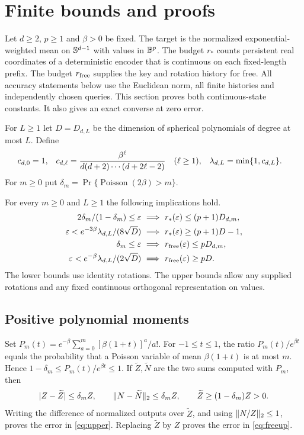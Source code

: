 \section{Finite bounds and proofs}\label{sec:finite}
Let $d\ge2$, $p\ge1$ and $\beta>0$ be fixed. The target is the normalized exponential-weighted mean on $\mathbb S^{d-1}$ with values in $\mathbb B^p$. The budget $r_*$ counts persistent real coordinates of a deterministic encoder that is continuous on each fixed-length prefix. The budget $r_{\mathrm{free}}$ supplies the key and rotation history for free. All accuracy statements below use the Euclidean norm, all finite histories and independently chosen queries. This section proves both continuous-state constants. It also gives an exact converse at zero error.

For $L\ge1$ let $D=D_{d,L}$ be the dimension of spherical polynomials of degree at most $L$. Define
\begin{align}
 c_{d,0}&=1, &
 c_{d,\ell}&=\frac{\beta^\ell}{d(d+2)\cdots(d+2\ell-2)}\quad(\ell\ge1),&
 \lambda_{d,L}&=\min\{1,c_{d,L}\}.\label{eq:spectralconst}
\end{align}
For $m\ge0$ put $\delta_m=\Pr\{\operatorname{Poisson}(2\beta)>m\}$.

\begin{theorem}\label{thm:finite}
For every $m\ge0$ and $L\ge1$ the following implications hold.
\begin{align}
 2\delta_m/(1-\delta_m)\le\varepsilon
 &\ \Longrightarrow\ r_*(\varepsilon)\le(p+1)D_{d,m},\label{eq:upper}\\
 \varepsilon<e^{-3\beta}\lambda_{d,L}/(8\sqrt D)
 &\ \Longrightarrow\ r_*(\varepsilon)\ge(p+1)D-1,\label{eq:lower}\\
 \delta_m\le\varepsilon
 &\ \Longrightarrow\ r_{\mathrm{free}}(\varepsilon)\le pD_{d,m},\label{eq:freeup}\\
 \varepsilon<e^{-\beta}\lambda_{d,L}/(2\sqrt D)
 &\ \Longrightarrow\ r_{\mathrm{free}}(\varepsilon)\ge pD.\label{eq:freelow}
\end{align}
The lower bounds use identity rotations. The upper bounds allow any supplied rotations and any fixed continuous orthogonal representation on values.
\end{theorem}

\subsection{Positive polynomial moments}\label{sec:upper}
Set $P_m(t)=e^{-\beta}\sum_{a=0}^m [\beta(1+t)]^a/a!$. For $-1\le t\le1$, the ratio $P_m(t)/e^{\beta t}$ equals the probability that a Poisson variable of mean $\beta(1+t)$ is at most $m$. Hence $1-\delta_m\le P_m(t)/e^{\beta t}\le1$. If $\widetilde Z,\widetilde N$ are the two sums computed with $P_m$, then
\begin{equation}
 |Z-\widetilde Z|\le\delta_m Z,\qquad
 \lVert N-\widetilde N\rVert_2\le\delta_m Z,\qquad
 \widetilde Z\ge(1-\delta_m)Z>0.\label{eq:uniform}
\end{equation}
Writing the difference of normalized outputs over $\widetilde Z$, and using $\lVert N/Z\rVert_2\le1$, proves the error in \eqref{eq:upper}. Replacing $\widetilde Z$ by $Z$ proves the error in \eqref{eq:freeup}.

